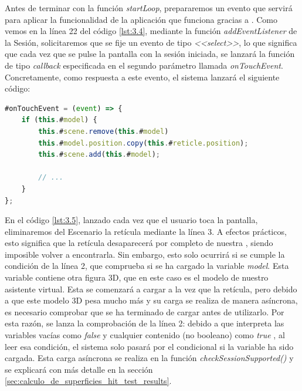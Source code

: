 \documentclass{subfiles}
\begin{document}
        Antes de terminar con la función \textit{startLoop}, prepararemos un evento que servirá para aplicar la funcionalidad de la aplicación que funciona gracias a \hittest. Como vemos en la línea 22 del código \ref{lst:3.4}, mediante la función \textit{addEventListener} de la Sesión, solicitaremos que se fije un evento de tipo \textit{<<select>>}, lo que significa que cada vez que se pulse la pantalla con la sesión iniciada, se lanzará la función de tipo \textit{callback} especificada en el segundo parámetro llamada \textit{onTouchEvent}. Concretamente, como respuesta a este evento, el sistema lanzará el siguiente código:

\begin{lstlisting}[language=JavaScript, caption={Respuesta al evento de tipo <<select>>.}, label={lst:3.5}]
#onTouchEvent = (event) => {
    if (this.#model) {
        this.#scene.remove(this.#model)
        this.#model.position.copy(this.#reticle.position);
        this.#scene.add(this.#model);
        
        // ...
    }
};
\end{lstlisting}

        En el código \ref{lst:3.5}, lanzado cada vez que el usuario toca la pantalla, eliminaremos del Escenario la retícula mediante la línea 3. A efectos prácticos, esto significa que la retícula desaparecerá por completo de nuestra \ra, siendo imposible volver a encontrarla. Sin embargo, esto solo ocurrirá si se cumple la condición de la línea 2, que comprueba si se ha cargado la variable \textit{model}. Esta variable contiene otra figura 3D, que en este caso es el modelo de nuestro asistente virtual. Esta se comenzará a cargar a la vez que la retícula, pero debido a que este modelo 3D pesa mucho más y su carga se realiza de manera asíncrona, es necesario comprobar que se ha terminado de cargar antes de utilizarlo. Por esta razón, se lanza la comprobación de la línea 2: debido a que \js interpreta las variables vacías como \textit{false} y cualquier contenido (no booleano) como \textit{true} \cite{web:mozilla_booleanevaluation}, al leer esa condición, el sistema solo pasará por el condicional si la variable ha sido cargada. Esta carga asíncrona se realiza en la función \textit{checkSessionSupported()} y se explicará con más detalle en la sección \ref{sec:calculo_de_superficies_hit_test_results}.
        
\end{document}
